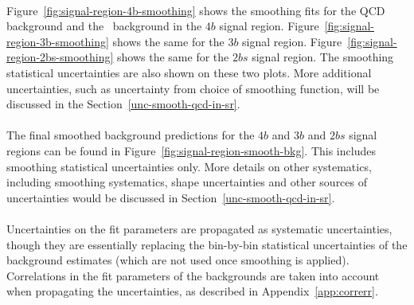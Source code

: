 \paragraph{}
Figure~\ref{fig:signal-region-4b-smoothing} shows the smoothing fits for the  QCD background and the \ttbar\ background in the $4b$ signal region.  Figure~\ref{fig:signal-region-3b-smoothing} shows the same for the $3b$ signal region. Figure~\ref{fig:signal-region-2bs-smoothing} shows the same for the $2bs$ signal region. The smoothing statistical uncertainties are also shown on these two plots. More additional uncertainties, such as uncertainty from choice of smoothing function, will be discussed in the Section~\ref{unc-smooth-qcd-in-sr}.

\paragraph{}
The final smoothed background predictions for the $4b$ and $3b$ and $2bs$ signal regions can be found in Figure~\ref{fig:signal-region-smooth-bkg}. This includes smoothing statistical uncertainties only. More details on other systematics, including smoothing systematics, shape uncertainties and other sources of uncertainties would be discussed in Section~\ref{unc-smooth-qcd-in-sr}.

\paragraph{}
Uncertainties on the fit parameters are propagated as systematic uncertainties, though they are essentially replacing the bin-by-bin statistical uncertainties of the background estimates (which are not used once smoothing is applied). Correlations in the fit parameters of the backgrounds are taken into account when propagating the uncertainties, as described in Appendix~\ref{app:correrr}.




